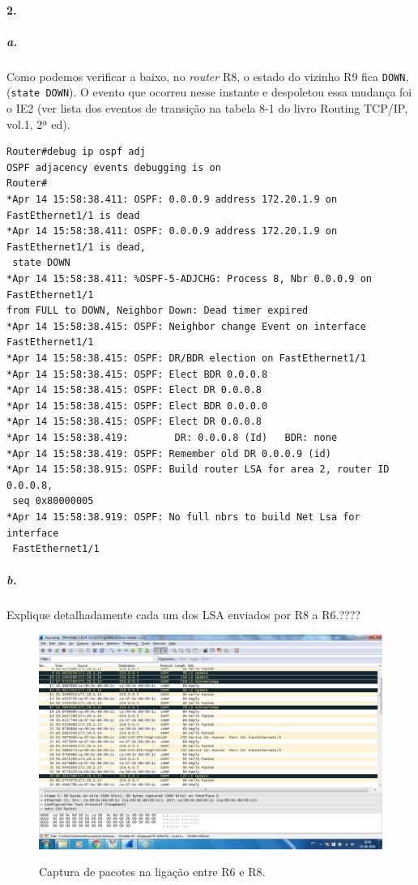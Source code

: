 \paragraph{2.}
\subparagraph{a.}
Como podemos verificar a baixo, no \emph{router} \textsf{R8}, o estado do vizinho \textsf{R9} fica \texttt{DOWN}, (\texttt{state DOWN}). O evento que ocorreu nesse instante e despoletou essa mudança foi o IE2 (ver lista dos eventos de transição na tabela 8-1 do livro Routing TCP/IP, vol.1, 2ª ed).

\begin{verbatim}
Router#debug ip ospf adj 
OSPF adjacency events debugging is on
Router#
*Apr 14 15:58:38.411: OSPF: 0.0.0.9 address 172.20.1.9 on FastEthernet1/1 is dead
*Apr 14 15:58:38.411: OSPF: 0.0.0.9 address 172.20.1.9 on FastEthernet1/1 is dead,
 state DOWN
*Apr 14 15:58:38.411: %OSPF-5-ADJCHG: Process 8, Nbr 0.0.0.9 on FastEthernet1/1 
from FULL to DOWN, Neighbor Down: Dead timer expired
*Apr 14 15:58:38.415: OSPF: Neighbor change Event on interface FastEthernet1/1
*Apr 14 15:58:38.415: OSPF: DR/BDR election on FastEthernet1/1 
*Apr 14 15:58:38.415: OSPF: Elect BDR 0.0.0.8
*Apr 14 15:58:38.415: OSPF: Elect DR 0.0.0.8
*Apr 14 15:58:38.415: OSPF: Elect BDR 0.0.0.0
*Apr 14 15:58:38.415: OSPF: Elect DR 0.0.0.8
*Apr 14 15:58:38.419:        DR: 0.0.0.8 (Id)   BDR: none 
*Apr 14 15:58:38.419: OSPF: Remember old DR 0.0.0.9 (id)
*Apr 14 15:58:38.915: OSPF: Build router LSA for area 2, router ID 0.0.0.8, 
 seq 0x80000005
*Apr 14 15:58:38.919: OSPF: No full nbrs to build Net Lsa for interface 
 FastEthernet1/1
\end{verbatim}

\subparagraph{b.}
Explique detalhadamente cada um dos LSA enviados por R8 a R6.????

\begin{figure}[h]
\centering
\includegraphics[width=1\textwidth, height=0.45\textheight]{2b.png}
\label{fig:captura R8-R6}
\caption{Captura de pacotes na ligação entre \textsf{R6} e \textsf{R8}.}
\end{figure}

